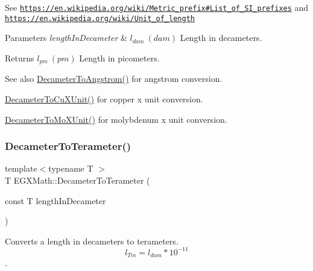 See \href{https://en.wikipedia.org/wiki/Metric_prefix#List_of_SI_prefixes}{\tt https\+://en.\+wikipedia.\+org/wiki/\+Metric\+\_\+prefix\#\+List\+\_\+of\+\_\+\+S\+I\+\_\+prefixes} and \href{https://en.wikipedia.org/wiki/Unit_of_length}{\tt https\+://en.\+wikipedia.\+org/wiki/\+Unit\+\_\+of\+\_\+length} 
\begin{DoxyParams}{Parameters}
{\em length\+In\+Decameter} & $ l_{dam}\ (dam)$ Length in decameters. \\
\hline
\end{DoxyParams}
\begin{DoxyReturn}{Returns}
$ l_{pm}\ (pm)$ Length in picometers. 
\end{DoxyReturn}
\begin{DoxySeeAlso}{See also}
\mbox{\hyperlink{group___e_g_x_math-_conversions-_length_conversions-_s_i-_decameter-_non-_s_i_ga2ea722ea1c773432c2680fe6ebd67638}{Decameter\+To\+Angstrom()}} for angstrom conversion. 

\mbox{\hyperlink{group___e_g_x_math-_conversions-_length_conversions-_s_i-_decameter-_non-_s_i_gaf256500ca4f0b7a62018ea61078c29e3}{Decameter\+To\+Cu\+X\+Unit()}} for copper x unit conversion. 

\mbox{\hyperlink{group___e_g_x_math-_conversions-_length_conversions-_s_i-_decameter-_non-_s_i_ga9e345feeb2568ded9fdceaf1d23d0ca6}{Decameter\+To\+Mo\+X\+Unit()}} for molybdenum x unit conversion. 
\end{DoxySeeAlso}
\mbox{\label{group___e_g_x_math-_conversions-_length_conversions-_s_i-_decameter-_s_i_ga94859159b401c261bf562ab4e3071508}} 
\subsubsection{\texorpdfstring{Decameter\+To\+Terameter()}{DecameterToTerameter()}}
{\footnotesize\ttfamily template$<$typename T $>$ \\
T E\+G\+X\+Math\+::\+Decameter\+To\+Terameter (\begin{DoxyParamCaption}\item[{const T}]{length\+In\+Decameter }\end{DoxyParamCaption})}



Converts a length in decameters to terameters. \[ l_{Tm}=l_{dam} * 10^{-11} \]. 

